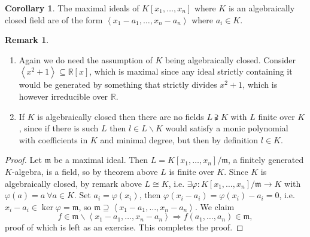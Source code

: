 \documentclass[a4paper]{article}
\newcommand{\la}{\left\langle}
\newcommand{\ra}{\right\rangle}
\newcommand{\m}{\mathfrak m}
\theoremstyle{definition}
\newtheorem{coro}[defn]{Corollary}
\newtheorem*{remark}{Remark}
\begin{document}
\begin{coro}
The maximal ideals of $K[x_1,\ldots,x_n]$ where $K$ is an algebraically closed field are of the form $\la x_1-a_1,\ldots,x_n-a_n\ra$ where $a_i\in K$.
\end{coro}
\begin{remark}
\begin{enumerate}
\item Again we do need the assumption of $K$ being algebraically closed. Consider $\la x^2+1\ra\subseteq \mathbb R[x]$, which is maximal since any ideal strictly containing it would be generated by something that strictly divides $x^2+1$, which is however irreducible over $\mathbb R$.
\item If $K$ is algebraically closed then there are no fields $L\supsetneqq K$ with $L$ finite over $K$, since if there is such $L$ then $l\in L\backslash K$ would satisfy a monic polynomial with coefficients in $K$ and minimal degree, but then by definition $l\in K$.
\end{enumerate}
\end{remark}
\begin{proof}
Let $\m$ be a maximal ideal. Then $L=K[x_1,\ldots,x_n]/\m$, a finitely generated $K$-algebra, is a field, so by theorem above $L$ is finite over $K$. Since $K$ is algebraically closed, by remark above $L\cong K$, i.e. $\exists\varphi:K[x_1,\ldots,x_n]/\m\rightarrow K$ with $\varphi(a)=a\ \forall a\in K$. Set $a_i=\varphi(x_i)$, then $\varphi(x_i-a_i)=\varphi(x_i)-a_i=0$, i.e. $x_i-a_i\in\ker\varphi=\m$, so $\m\supseteq\la x_1-a_1,\ldots,x_n-a_n\ra$. We claim
\[
f\in\m\backslash\la x_1-a_1,\ldots,x_n-a_n\ra \Rightarrow f(a_1,\ldots,a_n)\in\m,
\]
proof of which is left as an exercise. This completes the proof.
\end{proof}
\end{document}
